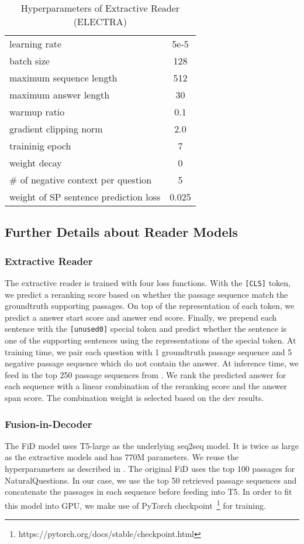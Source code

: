 \begin{table}[h]
    \centering
    \caption{Hyperparameters of Extractive Reader (ELECTRA)}
    \begin{tabular}{lc}
    \toprule
        learning rate & 5e-5\\
        batch size & 128 \\
        maximum sequence length & 512 \\
        maximum answer length & 30 \\
        warmup ratio & 0.1 \\
        gradient clipping norm & 2.0 \\
        traininig epoch & 7 \\
        weight decay & 0 \\
        \# of negative context per question & 5 \\
        weight of SP sentence prediction loss & 0.025 \\
    \bottomrule
    \end{tabular}
    \label{tab:my_label}
\end{table}

\subsection{Further Details about Reader Models}
\label{appendix:multihop_rag}

\subsubsection{Extractive Reader}
The extractive reader is trained with four loss functions. With the \texttt{[CLS]} token, we predict a reranking score based on whether the passage sequence match the groundtruth supporting passages. On top of the representation of each token, we predict a answer start score and answer end score. Finally, we prepend each sentence with the \texttt{[unused0]} special token and predict whether the sentence is one of the supporting sentences using the representations of the special token. At training time, we pair each question with 1 groundtruth passage sequence and 5 negative passage sequence which do not contain the answer. At inference time, we feed in the top 250 passage sequences from \method. We rank the predicted answer for each sequence with a linear combination of the reranking score and the answer span score. The combination weight is selected based on the dev results.

\subsubsection{Fusion-in-Decoder}
The FiD model uses T5-large as the underlying seq2seq model. It is twice as large as the extractive models and has 770M parameters. We reuse the hyperparameters as described in \citet{FiD}. The original FiD uses the top 100 passages for NaturalQuestions. In our case, we use the top 50 retrieved passage sequences and concatenate the passages in each sequence before feeding into T5. In order to fit this model into GPU, we make use of PyTorch checkpoint~\footnote{https://pytorch.org/docs/stable/checkpoint.html} for training. 


